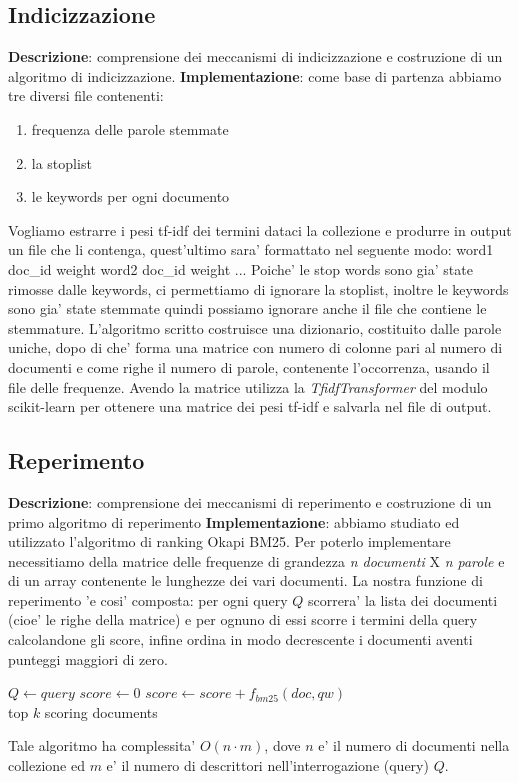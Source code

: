 \subsection{Indicizzazione} \label{sec:metodi-di-indic}

\textbf{Descrizione}: comprensione dei meccanismi di indicizzazione e costruzione di un algoritmo di indicizzazione.
\textbf{Implementazione}: come base di partenza abbiamo tre diversi file contenenti: \begin{enumerate}\item frequenza delle parole stemmate
 \item la stoplist 
 \item le keywords per ogni documento
  \end{enumerate}
Vogliamo estrarre i pesi tf-idf dei termini dataci la collezione e produrre in output un file che li contenga, quest'ultimo sara' formattato nel seguente modo: 
word1  doc\_id  weight
word2  doc\_id  weight
...
Poiche' le stop words sono gia' state rimosse dalle keywords, ci permettiamo di ignorare la stoplist, inoltre le keywords sono gia' state stemmate quindi possiamo ignorare anche il file che contiene le stemmature.
L'algoritmo scritto costruisce una dizionario, costituito dalle parole uniche, dopo di che' forma una matrice con numero di colonne pari al numero di documenti e come righe il numero di parole, contenente l'occorrenza, usando il file delle frequenze. Avendo la matrice utilizza la \textit{TfidfTransformer} del modulo scikit-learn per ottenere una matrice dei pesi tf-idf e salvarla nel file di output.

\subsection{Reperimento}
\label{sec:metodi-di-reper}

\textbf{Descrizione}: comprensione dei meccanismi di reperimento e costruzione di un primo algoritmo di reperimento
\textbf{Implementazione}: abbiamo studiato ed utilizzato l'algoritmo di ranking Okapi BM25. Per poterlo implementare necessitiamo della matrice delle frequenze di grandezza \textit{n documenti} X \textit{n parole} e di un array contenente le lunghezze dei vari documenti.
La nostra funzione di reperimento 'e cosi' composta: per ogni query $Q$ scorrera' la lista dei documenti (cioe' le righe della matrice) e per ognuno di essi scorre i termini della query calcolandone gli score, infine ordina in modo decrescente i documenti aventi punteggi maggiori di zero.
\begin{algorithmic}
\State $Q \gets query$
    \State $score\gets 0$
        \State $score \gets score + f_{bm25}(doc, qw)$
    \EndFor
\EndFor\\
\Return top $k$ scoring documents
\end{algorithmic}
Tale algoritmo ha complessita' $O(n \cdot m)$, dove $n$ e' il numero di documenti nella collezione ed $m$ e' il numero di descrittori nell'interrogazione (query) $Q$.

